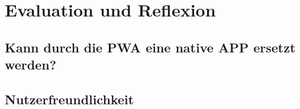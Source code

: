\chapter{Evaluation und Reflexion}
\label{Kap6}

\section{Kann durch die PWA eine native APP ersetzt werden?}

\section{Nutzerfreundlichkeit}
